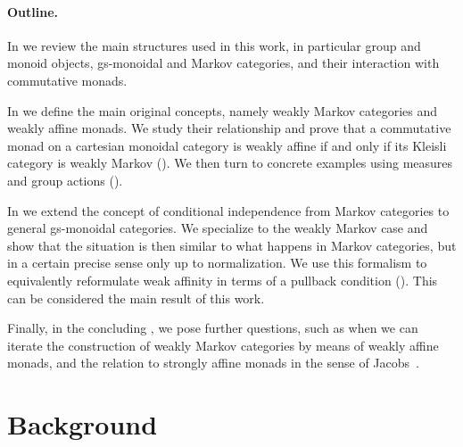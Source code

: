 \documentclass[a4paper,UKenglish,numberwithinsect,cleveref, autoref, thm-restate]{lipics-v2021}
\theoremstyle{plain} %
\theoremstyle{definition} %
\begin{document}
\paragraph*{Outline.}
In  we review the main structures used in this work, in particular group and monoid objects, gs-monoidal and Markov categories, and their interaction with commutative monads.

In  we define the main original concepts, namely weakly Markov categories and weakly affine monads. We study their relationship and prove that a commutative monad on a cartesian monoidal category is weakly affine if and only if its Kleisli category is weakly Markov ().
We then turn to concrete examples using measures and group actions ().

In  we extend the concept of conditional independence from Markov categories to general gs-monoidal categories. We specialize to the weakly Markov case and show that the situation is then similar to what happens in Markov categories, but in a certain precise sense only up to normalization.
We use this formalism to equivalently reformulate weak affinity in terms of a pullback condition (). This can be considered the main result of this work.

Finally, in the concluding , we pose further questions, such as when we can iterate the construction of weakly Markov categories by means of weakly affine monads, and the relation to strongly affine monads in the sense of Jacobs~\cite{Jacobs16}.


\section{Background}
\label{secbackground}
\end{document}
